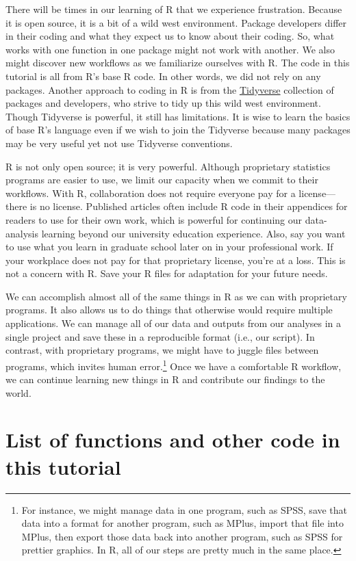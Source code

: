 \documentclass[
]{article}
\begin{document}
There will be times in our learning of R that we experience frustration. Because it is open source, it is a bit of a wild west environment. Package developers differ in their coding and what they expect us to know about their coding. So, what works with one function in one package might not work with another. We also might discover new workflows as we familiarize ourselves with R. The code in this tutorial is all from R's base R code. In other words, we did not rely on any packages. Another approach to coding in R is from the \href{https://www.tidyverse.org/}{Tidyverse} collection of packages and developers, who strive to tidy up this wild west environment. Though Tidyverse is powerful, it still has limitations. It is wise to learn the basics of base R's language even if we wish to join the Tidyverse because many packages may be very useful yet not use Tidyverse conventions.

R is not only open source; it is very powerful. Although proprietary statistics programs are easier to use, we limit our capacity when we commit to their workflows. With R, collaboration does not require everyone pay for a license---there is no license. Published articles often include R code in their appendices for readers to use for their own work, which is powerful for continuing our data-analysis learning beyond our university education experience. Also, say you want to use what you learn in graduate school later on in your professional work. If your workplace does not pay for that proprietary license, you're at a loss. This is not a concern with R. Save your R files for adaptation for your future needs.

We can accomplish almost all of the same things in R as we can with proprietary programs. It also allows us to do things that otherwise would require multiple applications. We can manage all of our data and outputs from our analyses in a single project and save these in a reproducible format (i.e., our script). In contrast, with proprietary programs, we might have to juggle files between programs, which invites human error.\footnote{For instance, we might manage data in one program, such as SPSS, save that data into a format for another program, such as MPlus, import that file into MPlus, then export those data back into another program, such as SPSS for prettier graphics. In R, all of our steps are pretty much in the same place.} Once we have a comfortable R workflow, we can continue learning new things in R and contribute our findings to the world.

\hypertarget{listoffunc}{%
\section{List of functions and other code in this tutorial}\label{listoffunc}}
\end{document}
